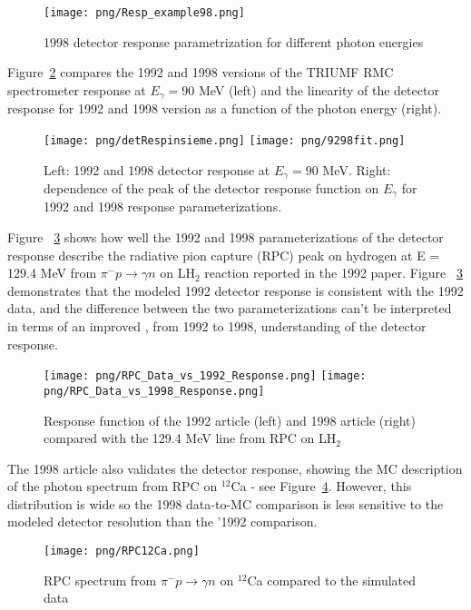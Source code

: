 \begin{figure}[!h]
\centering
\texttt{[image: png/Resp\_example98.png]}
\caption{1998 detector response parametrization for different photon energies}
\label{fig:response98}
\end{figure}

Figure~\ref{fig:shapecomp} compares the 1992 and 1998 versions of the
TRIUMF RMC spectrometer response at $E_{\gamma}=90$ MeV (left) and 
the linearity of the detector response for 1992 and 1998 version
as a function of the photon energy (right).

\begin{figure} [!h]
\centering
\texttt{[image: png/detRespinsieme.png]}
\texttt{[image: png/9298fit.png]}
\caption{
  Left: 1992 and 1998 detector response at $E_{\gamma}=90$ MeV.
  Right: dependence of the peak of the detector response function on $E_{\gamma}$
  for 1992 and 1998 response parameterizations.
}
\label{fig:shapecomp} 
\end{figure}

Figure ~\ref{p004} shows how well the 1992 and 1998 parameterizations of the detector
response describe the radiative pion capture (RPC) peak on hydrogen at E = 129.4 MeV
from $\pi^{-}p \rightarrow \gamma n$ on LH$_{2}$ reaction reported in the 1992 paper.
Figure ~\ref{p004} demonstrates that the modeled 1992 detector response is consistent
with the 1992 data, and the difference between the two parameterizations can't be
interpreted in terms of an improved , from 1992 to 1998, understanding of the detector
response.\\

  \begin{figure}[!h]
 \begin{center}
 \texttt{[image: png/RPC\_Data\_vs\_1992\_Response.png]} 
 \texttt{[image: png/RPC\_Data\_vs\_1998\_Response.png]} 
 \end{center}
 \caption{Response function of the 1992 article (left) and 1998 article (right) compared with the 129.4 MeV line from RPC on LH$_{2}$}
 \label{p004}
 \end{figure}

 The 1998 article also validates the detector response, showing the MC description of the
 photon spectrum from RPC on $^{12}$Ca  - see Figure~\ref{fig:art9}. However, this distribution
 is wide so the 1998 data-to-MC comparison is less sensitive to the modeled detector resolution
 than the '1992 comparison.

\begin{figure}[!h]
 \begin{center}
 \texttt{[image: png/RPC12Ca.png]} 
 \end{center}
 \caption{RPC spectrum from  $\pi^{-}p \rightarrow \gamma n$ on  $^{12}$Ca compared to the simulated data }
 \label{fig:art9}
 \end{figure}
